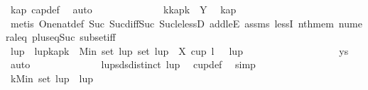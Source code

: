 \begin{isabellebody}
\ kap\ cap{\isacharunderscore}{\kern0pt}def\ \isamarkupfalse%
\ auto\isanewline
\ \ \ \ \ \ \ \ \ \ \ \ \isamarkupfalse%
\ k{}{\isacharcolon}{\kern0pt}{\isachardoublequoteopen}kap{\isacharbang}{\kern0pt}{\isacharparenleft}{\kern0pt}k{\isacharminus}{\kern0pt}{}{\isacharparenright}{\kern0pt}\ {\isasymin}\ Y{\isachardoublequoteclose}\ \isamarkupfalse%
\ kap\isanewline
\ \ \ \ \ \ \ \ \ \ \ \ \ \ \isamarkupfalse%
\ {\isacharparenleft}{\kern0pt}metis\ One{\isacharunderscore}{\kern0pt}nat{\isacharunderscore}{\kern0pt}def\ Suc{\isacharunderscore}{\kern0pt}{}\ Suc{\isacharunderscore}{\kern0pt}diff{\isacharunderscore}{\kern0pt}Suc\ Suc{\isacharunderscore}{\kern0pt}le{\isacharunderscore}{\kern0pt}lessD\ add{\isacharunderscore}{\kern0pt}leE\ assms{\isacharparenleft}{\kern0pt}{}{\isacharparenright}{\kern0pt}\ lessI\ nth{\isacharunderscore}{\kern0pt}mem\ numeral{\isacharunderscore}{\kern0pt}{}{\isacharunderscore}{\kern0pt}eq{\isacharunderscore}{\kern0pt}{}\ plus{\isacharunderscore}{\kern0pt}{}{\isacharunderscore}{\kern0pt}eq{\isacharunderscore}{\kern0pt}Suc\ subset{\isacharunderscore}{\kern0pt}iff{\isacharparenright}{\kern0pt}\isanewline
\ \ \ \ \ \ \ \ \ \ \ \ \isamarkupfalse%
\ \isamarkupfalse%
\ lup\ \ lup{\isacharcolon}{\kern0pt}{\isachardoublequoteopen}kap{\isacharbang}{\kern0pt}{\isacharparenleft}{\kern0pt}k{\isacharminus}{\kern0pt}{}{\isacharparenright}{\kern0pt}\ {\isacharequal}{\kern0pt}\ Min\ {\isacharparenleft}{\kern0pt}set\ lup{\isacharparenright}{\kern0pt}{\isachardoublequoteclose}\ {\isachardoublequoteopen}set\ lup\ {\isasymsubseteq}\ X{\isachardoublequoteclose}\ {\isachardoublequoteopen}cup\ {\isacharparenleft}{\kern0pt}l\ {\isacharminus}{\kern0pt}\ {}{\isacharparenright}{\kern0pt}\ {\isacharparenleft}{\kern0pt}lup{\isacharparenright}{\kern0pt}{\isachardoublequoteclose}\ \ \ \isanewline
\ \ \ \ \ \ \ \ \ \ \ \ \ \ \isamarkupfalse%
\ ys\ \isamarkupfalse%
\ auto\isanewline
\ \ \ \ \ \ \ \ \ \ \ \ \isamarkupfalse%
\ lup{\isacharunderscore}{\kern0pt}sd{\isacharcolon}{\kern0pt}{\isachardoublequoteopen}sdistinct\ lup{\isachardoublequoteclose}\ \isamarkupfalse%
\ cup{\isacharunderscore}{\kern0pt}def\ \isamarkupfalse%
\ simp\isanewline
\ \ \ \ \ \ \ \ \ \ \ \ \isamarkupfalse%
\ k{}{\isacharcolon}{\kern0pt}{\isachardoublequoteopen}Min\ {\isacharparenleft}{\kern0pt}set\ lup{\isacharparenright}{\kern0pt}\ {\isacharequal}{\kern0pt}\ lup{\isacharbang}{\kern0pt}{}{\isachardoublequoteclose}\ \isamarkupfalse%

\end{isabellebody}
